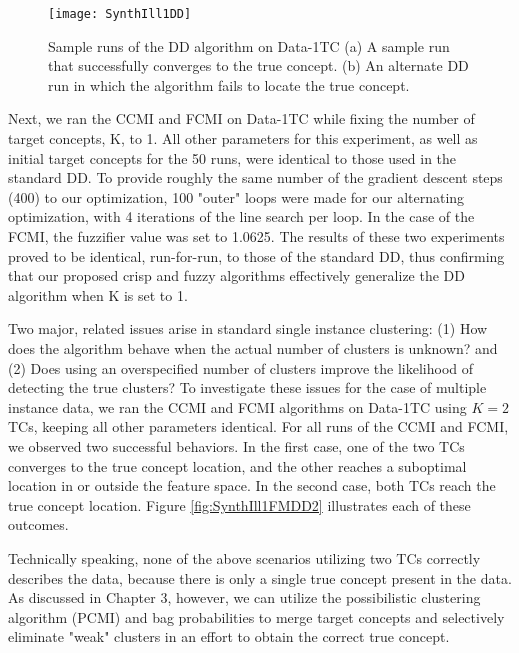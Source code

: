 \documentclass[12pt,dvips]{report}
\numberwithin{equation}{section}
\begin{document}
\begin{figure}[htb]
 \texttt{[image: SynthIll1DD]}
 
\caption{Sample runs of the DD algorithm on Data-1TC (a) A sample run that successfully converges to the true concept. (b) An alternate DD run in which the algorithm fails to locate the true concept.}
\label{fig:SynthIll1DD}
\end{figure}


 

Next, we ran the CCMI and FCMI on Data-1TC while fixing the number of target concepts, K, to 1.  All other parameters for this experiment, as well as initial target concepts for the 50 runs, were identical to those used in the standard DD.  To provide roughly the same number of the gradient descent steps (400) to our optimization, 100 "outer" loops were made for our alternating optimization, with 4 iterations of the line search per loop.  In the case of the FCMI, the fuzzifier value was set to 1.0625.   The results of these two experiments proved to be identical, run-for-run, to those of the standard DD, thus confirming that our proposed crisp and fuzzy algorithms effectively generalize the DD algorithm when K is set to 1.

Two major, related issues arise in standard single instance clustering: (1) How does the algorithm behave when the actual number of clusters is unknown? and (2) Does using an overspecified number of clusters improve the likelihood of detecting the true clusters?  To investigate these issues for the case of multiple instance data, we ran the CCMI and FCMI algorithms on Data-1TC using $K=2$ TCs, keeping all other parameters identical.  For all runs of the CCMI and FCMI, we observed two successful behaviors.  In the first case, one of the two TCs converges to the true concept location, and the other reaches a suboptimal location in or outside the feature space.  In the second case, both TCs reach the true concept location.  Figure \ref{fig:SynthIll1FMDD2} illustrates each of these outcomes.

Technically speaking, none of the above scenarios utilizing two TCs correctly describes the data, because there is only a single true concept present in the data.  As discussed in Chapter 3, however, we can utilize the possibilistic clustering algorithm (PCMI) and bag probabilities to merge target concepts and selectively eliminate "weak" clusters in an effort to  obtain the correct true concept.
\end{document}
